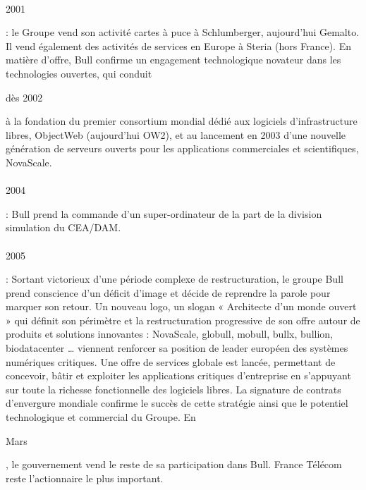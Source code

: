 \documentclass[11pt]{article}
\begin{document}
		\paragraph{}
		\begin{bf}2001\end{bf} : le Groupe vend son activité cartes à puce à Schlumberger, aujourd'hui Gemalto. Il vend 
		également des activités de services en Europe à Steria (hors France).
		En matière d’offre, Bull confirme un engagement technologique novateur dans les technologies ouvertes, qui conduit 
		\begin{bf}dès 2002\end{bf} à la fondation du premier consortium mondial dédié aux logiciels d’infrastructure libres, 
		ObjectWeb (aujourd’hui OW2), et au lancement en 2003 d’une nouvelle génération de serveurs ouverts pour les 
		applications commerciales et scientifiques, NovaScale.
		\paragraph{}
		\begin{bf}2004\end{bf} : Bull prend la commande d'un super-ordinateur de la part de la division simulation du CEA/DAM.
		\paragraph{}
		\begin{bf}2005\end{bf} : Sortant victorieux d’une période complexe de restructuration, le groupe Bull prend 
		conscience d’un déficit d’image et décide de reprendre la parole pour marquer son retour. Un nouveau logo, un slogan 
		« Architecte d’un monde ouvert » qui définit son périmètre et la restructuration progressive de son offre autour de 
		produits et solutions innovantes : NovaScale, globull, mobull, bullx, bullion, biodatacenter … viennent renforcer sa 
		position de leader européen des systèmes numériques critiques.
		Une offre de services globale est lancée, permettant de concevoir, bâtir et exploiter les applications critiques 
		d’entreprise en s’appuyant sur toute la richesse fonctionnelle des logiciels libres. La signature de contrats 
		d’envergure mondiale confirme le succès de cette stratégie ainsi que le potentiel technologique et commercial du Groupe.
		\newline
		En \begin{bf}Mars\end{bf}, le gouvernement vend le reste de sa participation dans Bull. France Télécom reste 
		l'actionnaire le plus important.
\end{document}
